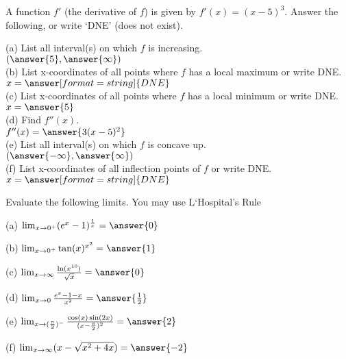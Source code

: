 \documentclass{ximera}
\begin{document}
\begin{exercise}
A function $f'$ (the derivative of $f$) is given by $f'(x)=(x-5)^3$. Answer the following, or write  `DNE' (does not exist).

(a) List all interval(s) on which $f$ is increasing.\\
$(\answer{5},\answer{\infty})$\\

(b) List x-coordinates of all points where $f$ has a local maximum or write DNE. \\
$x=\answer[format=string]{DNE}$\\

(c)  List x-coordinates of all points where $f$ has a local minimum or write DNE.\\

$x=\answer{5}$\\

(d) Find  $f''(x)$.\\

$f''(x)=\answer{3(x-5)^2}$\\

(e) List all interval(s) on which $f$ is concave up.\\

$(\answer{-\infty},\answer{\infty})$\\

(f) List x-coordinates of all inflection points of $f$ or write DNE.\\

$x=\answer[format=string]{DNE}$\\

\end{exercise}

\begin{exercise}
Evaluate the following limits.  You may use L`Hospital's Rule

(a) $\lim_{x\to 0^+} (e^x-1)^\frac{1}{x}=\answer{0}$

(b) $\lim_{x\to 0^+} \tan(x)^{x^2}=\answer{1}$

(c) $\lim_{x\to \infty} \frac{\ln(x^{10})}{\sqrt{x}}=\answer{0}$

(d) $\lim_{x\to 0} \frac{e^x-1-x}{x^2}=\answer{\frac{1}{2}}$

(e) $\lim_{x\to (\frac{\pi}{2})^-} \frac{\cos(x)\sin(2x)}{(x-\frac{\pi}{2})^2}=\answer{2}$

(f) $\lim_{x\to\infty} (x-\sqrt{x^2+4x})=\answer{-2}$
\end{exercise}
\end{document}
